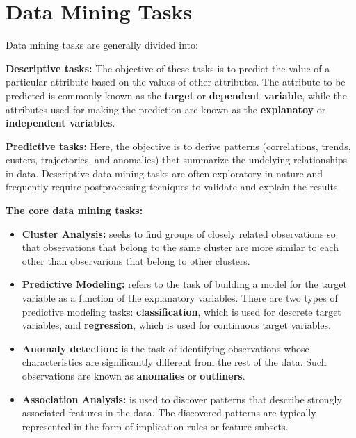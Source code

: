 \section{Data Mining Tasks}
	
	Data mining tasks are generally divided into:

	{\bf Descriptive tasks:} The objective of these tasks is to predict the value of a particular 
	attribute based on the values of other attributes. The attribute to be predicted is commonly 
	known as the {\bf target} or {\bf dependent variable}, while the attributes used for making the
	prediction are known as the {\bf explanatoy} or {\bf independent variables}. 

	{\bf Predictive tasks:} Here, the objective is to derive patterns (correlations, trends, custers, 
	trajectories, and anomalies) that summarize the undelying relationships in data. Descriptive 
	data mining tasks are often exploratory in nature and frequently require postprocessing tecniques
	to validate and explain the results. 

	{\bf The core data mining tasks:}
	\begin{itemize}
		\item {\bf Cluster Analysis:} seeks to find groups of closely related observations
		so that observations that belong to the same cluster are more similar to each other
		than observarions that belong to other clusters.
		\item {\bf Predictive Modeling:} refers to the task of building a model for the 
		target variable as a function of the explanatory variables. There are two types of 
		predictive modeling tasks: {\bf classification}, which is used for descrete target 
		variables, and {\bf regression}, which is used for continuous target variables. 
		\item {\bf Anomaly detection:} is the task of identifying observations whose 
		characteristics are significantly different from the rest of the data. Such observations
		are known as {\bf anomalies} or {\bf outliners}.
		\item {\bf Association Analysis:} is used to discover patterns that describe strongly
		associated features in the data. The discovered patterns are typically represented in the 
		form of implication rules or feature subsets. 

	\end{itemize}

	

